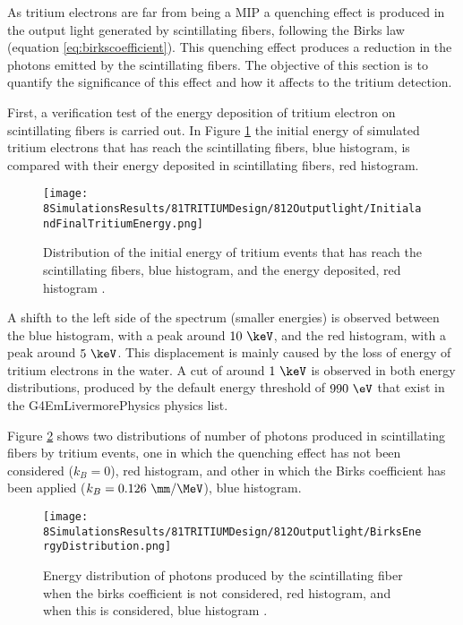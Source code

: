 As tritium electrons are far from being a MIP a quenching effect is produced in the output light generated by scintillating fibers, following the Birks law (equation \ref{eq:birkscoefficient}). This quenching effect produces a reduction in the photons emitted by the scintillating fibers. The objective of this section is to quantify the significance of this effect and how it affects to the tritium detection.

First, a verification test of the energy deposition of tritium electron on scintillating fibers is carried out. In Figure \ref{fig:InitialFinalTritiumEnergy} the initial energy of simulated tritium electrons that has reach the scintillating fibers, blue histogram, is compared with their energy deposited in scintillating fibers, red histogram.

\begin{figure}[h]
\centering
\texttt{[image: 8SimulationsResults/81TRITIUMDesign/812Outputlight/InitialandFinalTritiumEnergy.png]}
\caption{Distribution of the initial energy of tritium events that has reach the scintillating fibers, blue histogram, and the energy deposited, red histogram \cite{SimulationPaperCarlos}.\label{fig:InitialFinalTritiumEnergy}}
\end{figure}

A shifth to the left side of the spectrum (smaller energies) is observed between the blue histogram, with a peak around $10~\keV$, and the red histogram, with a peak around $5~\keV$. This displacement is mainly caused by the loss of energy of tritium electrons in the water. A cut of around $1~\keV$ is observed in both energy distributions, produced by the default energy threshold of $990~\eV$ that exist in the G4EmLivermorePhysics physics list.

Figure \ref{fig:BirksEffectinEnergyDistribution} shows two distributions of number of photons produced in scintillating fibers by tritium events, one in which the quenching effect has not been considered ($k_B=0$), red histogram, and other in which the Birks coefficient has been applied ($k_B=0.126~\mm/\MeV$), blue histogram.

\begin{figure}[h]
\centering
\texttt{[image: 8SimulationsResults/81TRITIUMDesign/812Outputlight/BirksEnergyDistribution.png]}
\caption{Energy distribution of photons produced by the scintillating fiber when the birks coefficient is not considered, red histogram, and when this is considered, blue histogram \cite{SimulationPaperCarlos}.\label{fig:BirksEffectinEnergyDistribution}}
\end{figure}  

